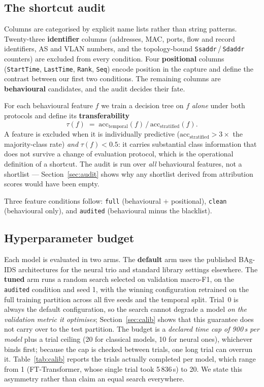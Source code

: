 \documentclass[review,12pt]{elsarticle}
\begin{document}
\subsection{The shortcut audit}
\label{sec:audit-protocol}
Columns are categorised by explicit name lists rather than string patterns. Twenty-three
\textbf{identifier} columns (addresses, MAC, ports, flow and record identifiers, AS and
VLAN numbers, and the topology-bound \texttt{Ssaddr}\,/\,\allowbreak\texttt{Sdaddr}
counters) are
excluded from every condition. Four \textbf{positional} columns (\texttt{StartTime},
\texttt{LastTime}, \texttt{Rank}, \texttt{Seq}) encode position in the capture and define
the contrast between our first two conditions. The remaining columns are
\textbf{behavioural} candidates, and the audit decides their fate.

For each behavioural feature $f$ we train a decision tree on $f$ \emph{alone} under both
protocols and define its \textbf{transferability}
\[
  \tau(f) \;=\; \mathrm{acc}_{\text{temporal}}(f) \,/\, \mathrm{acc}_{\text{stratified}}(f).
\]
A feature is excluded when it is individually predictive
($\mathrm{acc}_{\text{stratified}} > 3\times$ the majority-class rate) \emph{and}
$\tau(f) < 0.5$: it carries substantial class information that does not survive a change
of evaluation protocol, which is the operational definition of a shortcut. The audit is
run over \emph{all} behavioural features, not a shortlist --- Section~\ref{sec:audit}
shows why any shortlist derived from attribution scores would have been empty.

Three feature conditions follow: \texttt{full} (behavioural $+$ positional),
\texttt{clean} (behavioural only), and \texttt{audited} (behavioural minus the blacklist).

\subsection{Hyperparameter budget}
Each model is evaluated in two arms. The \textbf{default} arm uses the published BAg-IDS
architectures for the neural trio and standard library settings elsewhere. The
\textbf{tuned} arm runs a random search selected on validation macro-F1, on the
\texttt{audited} condition and seed 1, with the winning configuration retrained on the
full training partition across all five seeds and the temporal split. Trial~0 is always
the default configuration, so the search cannot degrade a model \emph{on the validation
metric it optimises}; Section~\ref{sec:calib} shows that this guarantee does not carry
over to the test partition. The budget is a
\emph{declared time cap of 900\,s per model} plus a trial ceiling (20 for classical
models, 10 for neural ones), whichever binds first; because the cap is checked between
trials, one long trial can overrun it. Table~\ref{tab:calib} reports the trials actually
completed per model, which range from 1 (FT-Transformer, whose single trial took
5\,836\,s) to 20. We state this asymmetry rather than claim an equal search everywhere.
\end{document}
